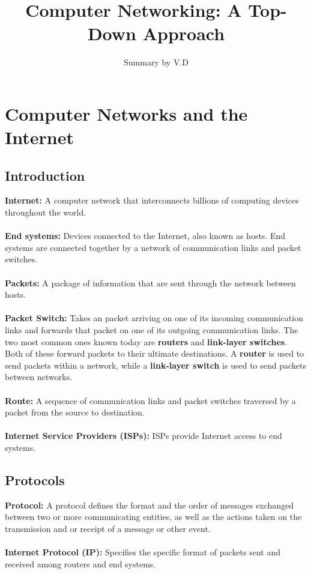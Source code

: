 \documentclass[]{article}
\title{Computer Networking: A Top-Down Approach}
\author{Summary by V.D}
\begin{document}
\maketitle
\section{Computer Networks and the Internet}
\subsection{Introduction}
\textcolor{TealBlue}{\textbf{Internet:}} A computer network that interconnects billions of computing devices throughout the world. \\\\
\textcolor{TealBlue}{\textbf{End systems:}} Devices connected to the Internet, also known as hosts. End systems are connected together by a network of communication links and packet switches. \\\\
\textcolor{TealBlue}{\textbf{Packets:}} A package of information that are sent through the network between hosts. \\\\
\textcolor{TealBlue}{\textbf{Packet Switch:}} Takes an packet arriving on one of its incoming communication links and forwards that packet on one of its outgoing communication links. The two most common ones known today are \textbf{routers} and \textbf{link-layer switches}. Both of these forward packets to their ultimate destinations. A \textbf{router} is used to send packets within a network, while a \textbf{link-layer switch} is used to send packets between networks.\\\\
\textcolor{TealBlue}{\textbf{Route:}} A sequence of communication links and packet switches traversed by a packet from the source to destination. \\\\
\textcolor{TealBlue}{\textbf{Internet Service Providers (ISPs):}} ISPs provide Internet access to end systems. 
\subsection{Protocols}
\textcolor{TealBlue}{\textbf{Protocol:}} A protocol defines the format and the order of messages exchanged between two or more communicating entities, as well as the actions taken on the transmission and or receipt of a message or other event. \\\\
\textcolor{TealBlue}{\textbf{Internet Protocol (IP):}} Specifies the specific format of packets sent and received among routers and end systems.
\end{document}
